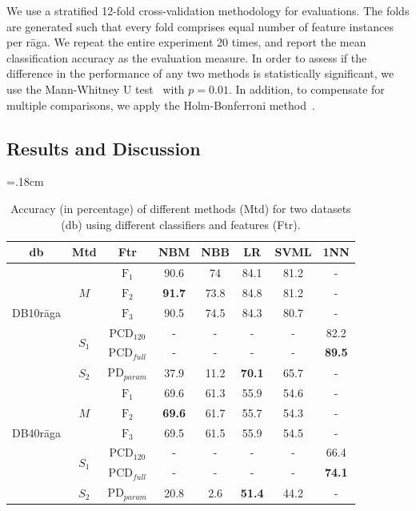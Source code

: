We use a stratified 12-fold cross-validation methodology for evaluations. The folds are generated such that every fold comprises equal number of feature instances per r\={a}ga. We repeat the entire experiment 20 times, and report the mean classification accuracy as the evaluation measure. In order to assess if the difference in the performance of any two methods is statistically significant, we use the Mann-Whitney U test~\cite{mann1947test} with $p=0.01$. In addition, to compensate for multiple comparisons, we apply the Holm-Bonferroni method~\cite{holm1979simple}. 


\subsection{Results and Discussion}
\label{sec:vsm_eval_results}


\begin{table}
	\tabcolsep=.18cm
	\centering
	\begin{tabular}{c|c|c|c c c c c}
		\hline
		db & Mtd & Ftr & NBM & NBB & LR & SVML & 1NN\tabularnewline
		\hline \hline 
		\multirow{5}{*}{\begin{turn}{90}DB10r\={a}ga\end{turn}} & \multirow{3}{*}{$M$} & $\mathrm{F_1}$ & 90.6 & 74 & 84.1 & 81.2 & -\tabularnewline
		
		&  & $\mathrm{F_2}$ & {\bf 91.7} & 73.8 & 84.8 & 81.2 & -\tabularnewline
		
		&  & $\mathrm{F_3}$ & 90.5 & 74.5 & 84.3 & 80.7 & -\tabularnewline
		\cline{2-8} 
		& \multirow{2}{*}{$S_1$} & $\mathrm{PCD}_{120}$ & - & - & - & - & 82.2\tabularnewline
		& & $\mathrm{PCD}_{full}$ & - & - & - & - & {\bf 89.5}\tabularnewline
		\cline{2-8} 
		& $S_2$ & $\mathrm{PD}_{param}$ & 37.9 & 11.2 & {\bf 70.1} & 65.7 & -\tabularnewline
		\hline \hline
		\multirow{5}{*}{\begin{turn}{90}DB40r\={a}ga\end{turn}} & \multirow{3}{*}{$M$} & $\mathrm{F_1}$ & 69.6 & 61.3 & 55.9 & 54.6 & -\tabularnewline
		
		&  & $\mathrm{F_2}$ & {\bf 69.6} & 61.7 & 55.7 & 54.3 & -\tabularnewline
		
		&  & $\mathrm{F_3}$ & 69.5 & 61.5 & 55.9 & 54.5 & -\tabularnewline
		\cline{2-8} 
		& \multirow{2}{*}{$S_1$} & $\mathrm{PCD}_{120}$ & - & - & - & - & 66.4\tabularnewline
		
		& & $\mathrm{PCD}_{full}$ & - & - & - & - & {\bf 74.1}\tabularnewline
		\cline{2-8} 
		& $S_2$ & $\mathrm{PD}_{param}$ & 20.8 & 2.6 & {\bf 51.4} & 44.2 & -\tabularnewline
		\hline \hline
	\end{tabular}
	
	\caption{Accuracy (in percentage) of different methods (Mtd) for two datasets (db) using different classifiers and features (Ftr).} 
	\label{tab:accuracies_for_variants}
\end{table}



